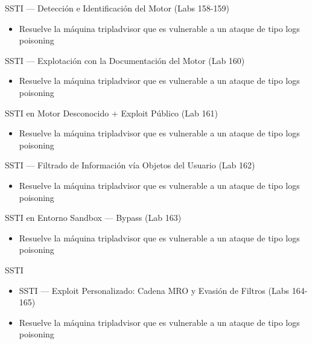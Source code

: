 \documentclass[aspectratio=169,10pt]{beamer}
\begin{document}
\begin{frame}[allowframebreaks]{SSTI --- Detección e Identificación del Motor (Labs 158-159)}
\small
  \begin{itemize}
  \item Resuelve la máquina tripladvisor que es vulnerable a un ataque de tipo logs poisoning
  \end{itemize}
\end{frame}

\begin{frame}[allowframebreaks]{SSTI --- Explotación con la Documentación del Motor (Lab 160)}
\small
  \begin{itemize}
  \item Resuelve la máquina tripladvisor que es vulnerable a un ataque de tipo logs poisoning
  \end{itemize}
\end{frame}

\begin{frame}[allowframebreaks]{SSTI en Motor Desconocido + Exploit Público (Lab 161)}
\small
  \begin{itemize}
  \item Resuelve la máquina tripladvisor que es vulnerable a un ataque de tipo logs poisoning
  \end{itemize}
\end{frame}

\begin{frame}[allowframebreaks]{SSTI --- Filtrado de Información vía Objetos del Usuario (Lab 162)}
\small
  \begin{itemize}
  \item Resuelve la máquina tripladvisor que es vulnerable a un ataque de tipo logs poisoning
  \end{itemize}
\end{frame}

\begin{frame}[allowframebreaks]{SSTI en Entorno Sandbox --- Bypass (Lab 163)}
\small
  \begin{itemize}
  \item Resuelve la máquina tripladvisor que es vulnerable a un ataque de tipo logs poisoning
  \end{itemize}
\end{frame}

\begin{frame}[allowframebreaks]{SSTI}
\small
  \begin{itemize}
  \item SSTI --- Exploit Personalizado: Cadena MRO y Evasión de Filtros (Labs 164-165)
  \item Resuelve la máquina tripladvisor que es vulnerable a un ataque de tipo logs poisoning
  \end{itemize}
\end{frame}
\end{document}
